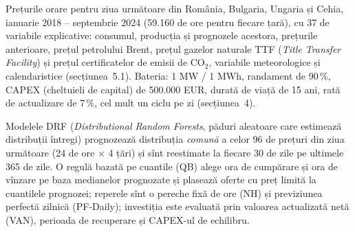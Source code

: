 \textbf{} %
{Prețurile orare pentru ziua următoare din România, Bulgaria, Ungaria și Cehia, ianuarie 2018 -- septembrie 2024 (59.160 de ore pentru fiecare țară), cu 37 de variabile explicative: consumul, producția și prognozele acestora, prețurile anterioare, prețul petrolului Brent, prețul gazelor naturale TTF (\emph{Title Transfer Facility}) și prețul certificatelor de emisii de CO$_2$, variabile meteorologice și calendaristice (secțiunea~5.1).
Bateria: 1 MW / 1 MWh, randament de 90\,\%, CAPEX (cheltuieli de capital) de 500.000 EUR, durată de viață de 15 ani, rată de actualizare de 7\,\%, cel mult un ciclu pe zi (secțiunea~4).}

\textbf{} %
{Modelele DRF (\emph{Distributional Random Forests}, păduri aleatoare care estimează distribuții întregi) prognozează distribuția \emph{comună} a celor 96 de prețuri din ziua următoare (24 de ore $\times$ 4 țări) și sînt reestimate la fiecare 30 de zile pe ultimele 365 de zile.
O regulă bazată pe cuantile (QB) alege ora de cumpărare și ora de vînzare pe baza medianelor prognozate și plasează oferte cu preț limită la cuantilele prognozei; reperele sînt o pereche fixă de ore (NH) și previziunea perfectă zilnică (PF-Daily); investiția este evaluată prin valoarea actualizată netă (VAN), perioada de recuperare și CAPEX-ul de echilibru.}

